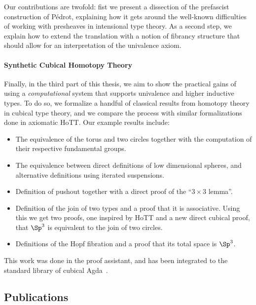 Our contributions are twofold: fist we present a dissection of the prefascist 
construction of Pédrot, explaining how it gets around the well-known 
difficulties of working with presheaves in intensional type theory.
% 
As a second step, we explain how to extend the translation with a notion of 
fibrancy structure that should allow for an interpretation of the univalence
axiom.

\paragraph{Synthetic Cubical Homotopy Theory}
% 
Finally, in the third part of this thesis, we aim to show the practical 
gains of using a \emph{computational} system that supports univalence and 
higher inductive types. 
% 
To do so, we formalize a handful of classical results from homotopy theory 
in cubical type theory, and we compare the process with similar formalizations
done in axiomatic HoTT.
% 
Our example results include:
%
\begin{itemize}
\item The equivalence of the torus and two circles together with the
  computation of their respective fundamental groups.
\item The equivalence between direct definitions of low dimensional
  spheres, and alternative definitions using iterated suspensions.
\item Definition of pushout together with a direct proof of the ``$3
  \times 3$ lemma''.
\item Definition of the join of two types and a proof that it is
  associative. Using this we get two proofs, one
  inspired by HoTT and a new direct cubical proof, that $\Sp^3$ is
  equivalent to the join of two circles.
\item Definitions of the Hopf fibration and a proof that its total
  space is $\Sp^3$.
\end{itemize}

This work was done in the \Agda proof assistant, and has been integrated to the
standard library of cubical Agda~.

\subsection{Publications}

